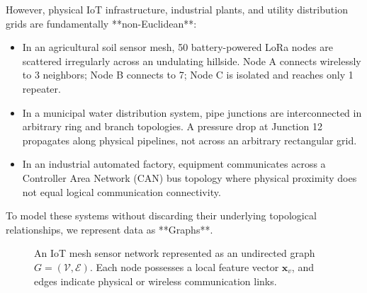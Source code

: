 However, physical IoT infrastructure, industrial plants, and utility distribution grids are fundamentally **non-Euclidean**:
\begin{itemize}
    \item In an agricultural soil sensor mesh, 50 battery-powered LoRa nodes are scattered irregularly across an undulating hillside. Node A connects wirelessly to 3 neighbors; Node B connects to 7; Node C is isolated and reaches only 1 repeater.
    \item In a municipal water distribution system, pipe junctions are interconnected in arbitrary ring and branch topologies. A pressure drop at Junction 12 propagates along physical pipelines, not across an arbitrary rectangular grid.
    \item In an industrial automated factory, equipment communicates across a Controller Area Network (CAN) bus topology where physical proximity does not equal logical communication connectivity.
\end{itemize}

To model these systems without discarding their underlying topological relationships, we represent data as **Graphs**.

\begin{figure}[htbp]
\centering
{}
\caption{An IoT mesh sensor network represented as an undirected graph $G = (\mathcal{V}, \mathcal{E})$. Each node possesses a local feature vector $\mathbf{x}_v$, and edges indicate physical or wireless communication links.}\label{fig:iot_graph}
\end{figure}

